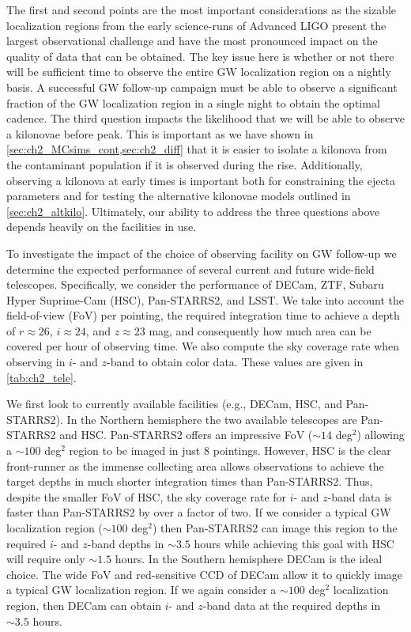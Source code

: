 The first and second points are the most important considerations as the sizable localization regions from the early science-runs of Advanced LIGO present the largest observational challenge and have the most pronounced impact on the quality of data that can be obtained. The key issue here is whether or not there will be sufficient time to observe the entire GW localization region on a nightly basis. A successful GW follow-up campaign must be able to observe a significant fraction of the GW localization region in a single night to obtain the optimal cadence. The third question impacts the likelihood that we will be able to observe a kilonovae before peak. This is important as we have shown in \cref{sec:ch2_MCsims_cont,sec:ch2_diff} that it is easier to isolate a kilonova from the contaminant population if it is observed during the rise. Additionally, observing a kilonova at early times is important both for constraining the ejecta parameters and for testing the alternative kilonovae models outlined in \cref{sec:ch2_altkilo}. Ultimately, our ability to address the three questions above depends heavily on the facilities in use.

To investigate the impact of the choice of observing facility on GW follow-up we determine the expected performance of several current and future wide-field telescopes. Specifically, we consider the performance of DECam, ZTF, Subaru Hyper Suprime-Cam (HSC), Pan-STARRS2, and LSST. We take into account the field-of-view (FoV) per pointing, the required integration time to achieve a depth of $r\approx26$, $i\approx24$, and $z\approx23$ mag, and consequently how much area can be covered per hour of observing time. We also compute the sky coverage rate when observing in $i$- and $z$-band to obtain color data. These values are given in \cref{tab:ch2_tele}. 

We first look to currently available facilities (e.g., DECam, HSC, and Pan-STARRS2). In the Northern hemisphere the two available telescopes are Pan-STARRS2 and HSC. Pan-STARRS2 offers an impressive FoV ($\sim14$ deg$^2$) allowing a $\sim100$ deg$^2$ region to be imaged in just $8$ pointings. However, HSC is the clear front-runner as  the immense collecting area allows observations to achieve the target depths in much shorter integration times than Pan-STARRS2. Thus, despite the smaller FoV of HSC, the sky coverage rate for $i$- and $z$-band data is faster than Pan-STARRS2 by over a factor of two. If we consider a typical GW localization region ($\sim 100$ deg$^2$) then Pan-STARRS2 can image this region to the required $i$- and $z$-band depths in $\sim 3.5$ hours while achieving this goal with HSC will require only $\sim1.5$ hours. In the Southern hemisphere DECam is the ideal choice. The wide FoV and red-sensitive CCD of DECam allow it to quickly image a typical GW localization region. If we again consider a $\sim100$ deg$^2$  localization region, then DECam can obtain $i$- and $z$-band data at the required depths in $\sim3.5$ hours. 


